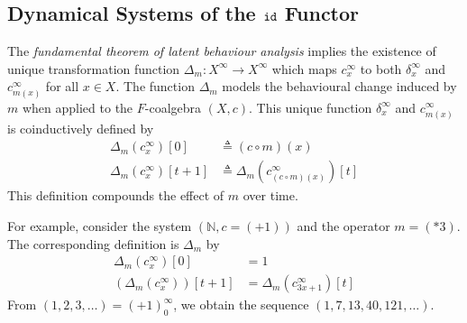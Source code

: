 \begin{definition}
\section{Dynamical Systems of the ${\texttt{id}}$ Functor}



The \emph{fundamental theorem of latent behaviour analysis} implies the existence of unique transformation function $\Delta_m\colon X^\infty\rightarrow X^\infty$ which maps $c_{x}^\infty$ to both $\delta_{x}^\infty$ and $c_{m(x)}^\infty$ for all $x\in X$. The function $\Delta_m$ models the behavioural change induced by $m$ when applied to the $F$-coalgebra $(X,c)$. This unique function $\delta_{x}^\infty$ and $c_{m(x)}^\infty$ is 
coinductively defined by 
\begin{align*}
    \Delta_{m}(c^\infty_x)[0]&\triangleq (c \circ m)(x)\\
    \Delta_{m}(c^\infty_x)[t+1]&\triangleq \Delta_{m}\left(c^\infty_{(c\circ m)(x)}\right)[t]
\end{align*}
This definition compounds the effect of $m$ over time.

For example, consider the system $(\mathbb{N},c=(+1))$ and the operator $m=(*3)$. The corresponding definition is $\Delta_{m}$ by
\begin{align*}
    \Delta_{m}(c^\infty_x)[0]&=1\\%
    (\Delta_{m}(c^\infty_x))[t+1]&=\Delta_{m}(c^\infty_{3x+1})[t]
\end{align*}
From $(1,2,3,\ldots)=(+1)^\infty_0$, we obtain the sequence $(1,7,13,40,121,\ldots)$. 


\end{definition}
